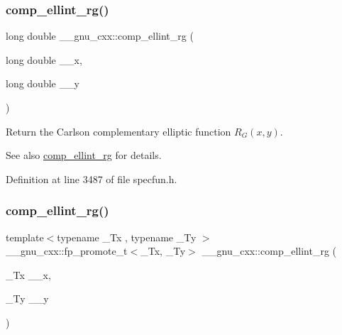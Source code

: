 \subsubsection{\texorpdfstring{comp\+\_\+ellint\+\_\+rg()}{comp\_ellint\_rg()}\hspace{0.1cm}{\footnotesize\ttfamily [2/3]}}
{\footnotesize\ttfamily long double \+\_\+\+\_\+gnu\+\_\+cxx\+::comp\+\_\+ellint\+\_\+rg (\begin{DoxyParamCaption}\item[{long double}]{\+\_\+\+\_\+x,  }\item[{long double}]{\+\_\+\+\_\+y }\end{DoxyParamCaption})\hspace{0.3cm}{\ttfamily [inline]}}

Return the Carlson complementary elliptic function $ R_G(x,y) $.

\begin{DoxySeeAlso}{See also}
\hyperlink{group__mathsf__gnu_ga978f8eec6e5edc918b243925dbacb65b}{comp\+\_\+ellint\+\_\+rg} for details. 
\end{DoxySeeAlso}


Definition at line 3487 of file specfun.\+h.

\mbox{\label{group__mathsf__gnu_ga389b1ef6cad1e33c1120665a4b915642}} 
\subsubsection{\texorpdfstring{comp\+\_\+ellint\+\_\+rg()}{comp\_ellint\_rg()}\hspace{0.1cm}{\footnotesize\ttfamily [3/3]}}
{\footnotesize\ttfamily template$<$typename \+\_\+\+Tx , typename \+\_\+\+Ty $>$ \\
\+\_\+\+\_\+gnu\+\_\+cxx\+::fp\+\_\+promote\+\_\+t$<$\+\_\+\+Tx, \+\_\+\+Ty$>$ \+\_\+\+\_\+gnu\+\_\+cxx\+::comp\+\_\+ellint\+\_\+rg (\begin{DoxyParamCaption}\item[{\+\_\+\+Tx}]{\+\_\+\+\_\+x,  }\item[{\+\_\+\+Ty}]{\+\_\+\+\_\+y }\end{DoxyParamCaption})\hspace{0.3cm}{\ttfamily [inline]}}

